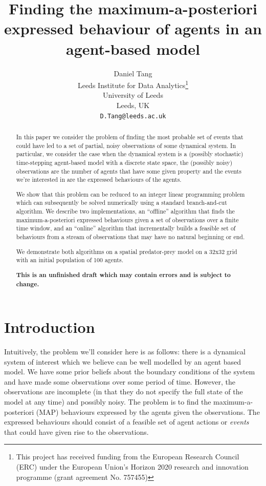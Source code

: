 \documentclass{article}
\title{Finding the maximum-a-posteriori expressed behaviour of agents in an agent-based model}
\author{
  Daniel Tang\\
  Leeds Institute for Data Analytics\thanks{This project has received funding from the European Research Council (ERC) under the European Union’s Horizon 2020 research and innovation programme (grant agreement No. 757455)}\\
  University of Leeds\\
  Leeds, UK\\
  \texttt{D.Tang@leeds.ac.uk} \\
}
\begin{document}
\maketitle

\begin{abstract}
In this paper we consider the problem of finding the most probable set of events that could have led to a set of partial, noisy observations of some dynamical system. In particular, we consider the case when the dynamical system is a (possibly stochastic) time-stepping agent-based model with a discrete state space, the  (possibly noisy) observations are the number of agents that have some given property and the events we're interested in are the expressed behaviours of the agents.

We show that this problem can be reduced to an integer linear programming problem which can subsequently be solved numerically using a standard branch-and-cut algorithm. We describe two implementations, an ``offline'' algorithm that finds the maximum-a-posteriori expressed behaviours given a set of observations over a finite time window, and an ``online'' algorithm that incrementally builds a feasible set of behaviours from a stream of observations that may have no natural beginning or end.

We demonstrate both algorithms on a spatial predator-prey model on a 32x32 grid with an initial population of 100 agents.

\textbf{This is an unfinished draft which may contain errors and is subject to change.}
\end{abstract}


\section{Introduction}

Intuitively, the problem we'll consider here is as follows: there is a dynamical system of interest which we believe can be well modelled by an agent based model. We have some prior beliefs about the boundary conditions of the system and have made some observations over some period of time. However, the observations are incomplete (in that they do not specify the full state of the model at any time) and possibly noisy. The problem is to find the maximum-a-posteriori (MAP) behaviours expressed by the agents given the observations. The expressed behaviours should consist of a feasible set of agent actions or \textit{events} that could have given rise to the observations.
\end{document}
